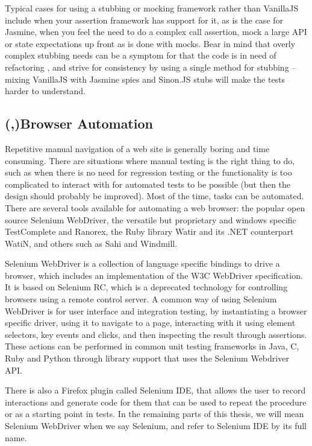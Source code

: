 \documentclass[11pt]{article}
\begin{document}
Typical cases for using a stubbing or mocking framework rather than VanillaJS include when your assertion framework has support for it, as is the case for Jasmine, when you feel the need to do a complex call assertion, mock a large API or state expectations up front as is done with mocks. Bear in mind that overly complex stubbing needs can be a symptom for that the code is in need of refactoring \cite[question~34]{Stenmark}, and strive for consistency by using a single method for stubbing -- mixing VanillaJS with Jasmine spies and Sinon.JS stubs will make the tests harder to understand.

\subsection{(,)Browser Automation}
\label{subsec:browserautomation}

Repetitive manual navigation of a web site is generally boring and time consuming. There are situations where manual testing is the right thing to do, such as when there is no need for regression testing or the functionality is too complicated to interact with for automated tests to be possible (but then the design should probably be improved). Most of the time, tasks can be automated. There are several tools available for automating a web browser: the popular open source Selenium WebDriver, the versatile but proprietary and windows specific TestComplete and Ranorex, the Ruby library Watir and its .NET counterpart WatiN, and others such as Sahi and Windmill.

Selenium WebDriver is a collection of language specific bindings to drive a browser, which includes an implementation of the W3C WebDriver specification. It is based on Selenium RC, which is a deprecated technology for controlling browsers using a remote control server. A common way of using Selenium WebDriver is for user interface and integration testing, by instantiating a browser specific driver, using it to navigate to a page, interacting with it using element selectors, key events and clicks, and then inspecting the result through assertions. These actions can be performed in common unit testing frameworks in Java, C\nolinebreak\hspace{-.05em}\raisebox{.3ex}{\scriptsize\bf \#}, Ruby and Python through library support that uses the Selenium Webdriver API. \cite{Selenium}

There is also a Firefox plugin called Selenium IDE, that allows the user to record interactions and generate code for them that can be used to repeat the procedure or as a starting point in tests. In the remaining parts of this thesis, we will mean Selenium WebDriver when we say Selenium, and refer to Selenium IDE by its full name.
\end{document}
